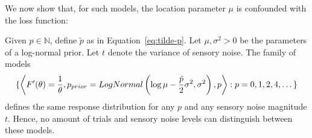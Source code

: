 We now show that, for such models, the location parameter $\mu$ is confounded with the loss function:
\begin{thm}
Given $p \in \mathbb{N}$, define $\tilde{p}$ as in Equation~\ref{eq:tilde-p}.
Let $\mu, \sigma^2 > 0$ be the parameters of a log-normal prior. Let $t$ denote the variance of sensory noise.
    The family of models
    \begin{equation}\label{eq:lognormal-family}
      \{  \left\langle F'(\theta) = \frac{1}{\theta}, p_{prior} = LogNormal\left(\log \mu - \frac{\tilde{p}}{2}\sigma^2, \sigma^2\right), p\right\rangle : p =0, 1, 2, 4, \dots\}
    \end{equation}
    defines the same response distribution for any $p$ and any sensory noise magnitude $t$.
    Hence, no amount of trials and sensory noise levels can distinguish between these models.
\end{thm}

